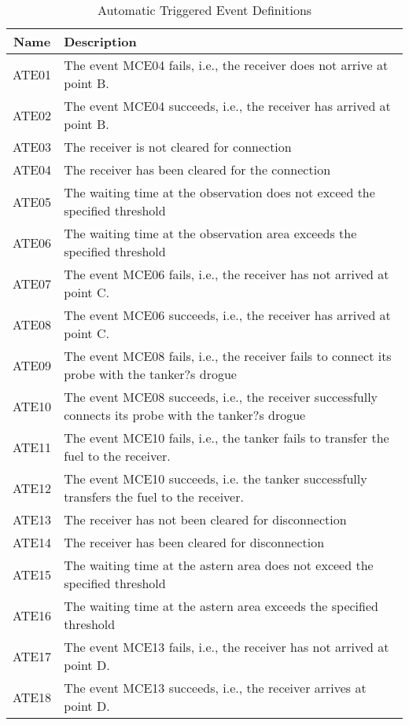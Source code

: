 \begin{table}
	\caption{Automatic Triggered Event Definitions}
	\label{tab:ATE}
	\begin{threeparttable}
		\begin{tabular}{cp{15cm}}
			\hline \hline
			Name & Description \\
			\hline \hline 
			ATE01 & The event MCE04 fails, i.e., the receiver does not arrive at point B\tnote{1}. \\ 
			ATE02 & The event MCE04 succeeds, i.e., the receiver has arrived at point B. \\ 
			ATE03 & The receiver is not cleared for connection \\ 
			ATE04 & The receiver has been cleared for the connection \\ 
			ATE05 & The waiting time at the observation does not exceed the specified threshold \\ 
			ATE06 & The waiting time at the observation area exceeds the specified threshold \\ 
			ATE07 & The event MCE06 fails, i.e., the receiver has not arrived at point C. \\ 
			ATE08 & The event MCE06 succeeds, i.e., the receiver has arrived at point C. \\ 
			ATE09 & The event MCE08 fails, i.e., the receiver fails to connect its probe with the tanker?s drogue \\ 
			ATE10 & The event MCE08 succeeds, i.e., the receiver successfully connects its probe with the tanker?s drogue \\ 
			ATE11 & The event MCE10 fails, i.e., the tanker fails to transfer the fuel to the receiver. \\ 
			ATE12 & The event MCE10 succeeds, i.e. the tanker successfully transfers the fuel to the receiver.\\ 
			ATE13 & The receiver has not been cleared for disconnection \\ 
			ATE14 & The receiver has been cleared for disconnection \\ 
			ATE15 & The waiting time at the astern area does not exceed the specified threshold \\ 
			ATE16 & The waiting time at the astern area exceeds the specified threshold \\ 
			ATE17 &The event MCE13 fails, i.e., the receiver has not arrived at point D. \\ 
			ATE18 & The event MCE13 succeeds, i.e., the receiver arrives at point D. \\ 

\end{tabular}
\end{threeparttable}
\end{table}
